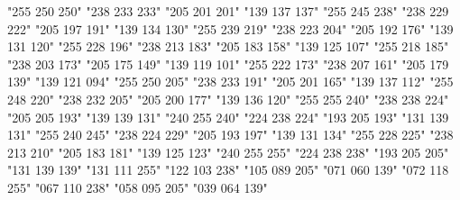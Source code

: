             {"255 250 250"}
            {"238 233 233"}
            {"205 201 201"}
            {"139 137 137"}
        {"255 245 238"}
        {"238 229 222"}
        {"205 197 191"}
        {"139 134 130"}
   {"255 239 219"}
   {"238 223 204"}
   {"205 192 176"}
   {"139 131 120"}
          {"255 228 196"}
          {"238 213 183"}
          {"205 183 158"}
          {"139 125 107"}
      {"255 218 185"}
      {"238 203 173"}
      {"205 175 149"}
      {"139 119 101"}
    {"255 222 173"}
    {"238 207 161"}
    {"205 179 139"}
    {"139 121 094"}
   {"255 250 205"}
   {"238 233 191"}
   {"205 201 165"}
   {"139 137 112"}
        {"255 248 220"}
        {"238 232 205"}
        {"205 200 177"}
        {"139 136 120"}
           {"255 255 240"}
           {"238 238 224"}
           {"205 205 193"}
           {"139 139 131"}
        {"240 255 240"}
        {"224 238 224"}
        {"193 205 193"}
        {"131 139 131"}
  {"255 240 245"}
  {"238 224 229"}
  {"205 193 197"}
  {"139 131 134"}
      {"255 228 225"}
      {"238 213 210"}
      {"205 183 181"}
      {"139 125 123"}
           {"240 255 255"}
           {"224 238 238"}
           {"193 205 205"}
           {"131 139 139"}
      {"131 111 255"}
      {"122 103 238"}
      {"105 089 205"}
      {"071 060 139"}
      {"072 118 255"}
      {"067 110 238"}
      {"058 095 205"}
      {"039 064 139"}
